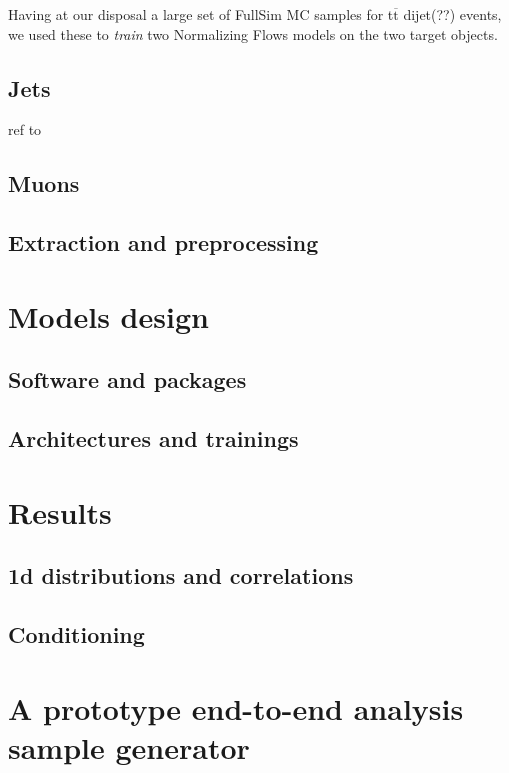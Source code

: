 Having at our disposal a large set of FullSim MC samples for t$\overline{\text{t}}$ dijet(??) events, we used these to \emph{train} two Normalizing Flows models on the two target objects.
\subsection{Jets}
ref to \cite{nanoaodcont}
\subsection{Muons}

\subsection{Extraction and preprocessing}

\section{Models design}

\subsection{Software and packages}

\subsection{Architectures and trainings}

\section{Results}

\subsection{1d distributions and correlations}

\subsection{Conditioning}

\section{A prototype end-to-end analysis sample generator}
